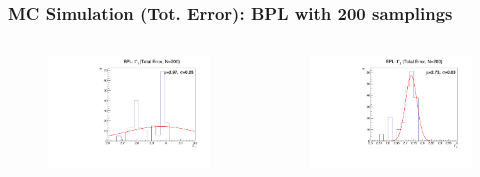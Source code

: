 \documentclass{beamer}
\begin{document}
\begin{frame}
  \frametitle{MC Simulation (Tot. Error): BPL with 200 samplings}
  \begin{columns}
    \begin{figure}[h!]
      \includegraphics[height=\textwidth]{figure/monte_carlo/N200/BPLwHe_gamma1_tot.pdf}
    \end{figure}
  
    \begin{figure}[h!]
      \includegraphics[height=\textwidth]{figure/monte_carlo/N200/BPLwHe_gamma2_tot.pdf}
    \end{figure}


\end{columns}
\end{frame}
\end{document}
